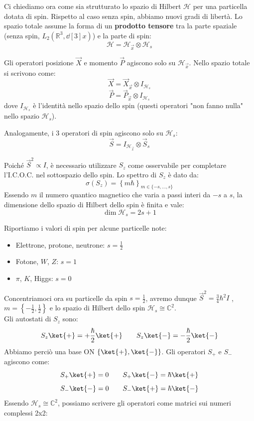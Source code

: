 Ci chiediamo ora come sia strutturato lo spazio di Hilbert \(\mathcal{H}\) per una particella dotata di spin.
Rispetto al caso senza spin, abbiamo nuovi gradi di libertà. Lo spazio totale assume la forma di un \textbf{prodotto tensore} tra la parte spaziale (senza spin, \(L_2(\mathbb{R}^3, \dd[3]{x})\)) e la parte di spin:
\begin{equation}
    \mathcal{H} = \mathcal{H}_{\vec{x}} \otimes \mathcal{H}_s
\end{equation}

Gli operatori posizione \(\vec{X}\) e momento \(\vec{P}\) agiscono solo su \(\mathcal{H}_{\vec{x}}\). Nello spazio totale si scrivono come:
\[
    \vec{X} = \vec{X}_{\vec{x}} \otimes I_{\mathcal{H}_s}
\]
\[
    \vec{P} = \vec{P}_{\vec{x}} \otimes I_{\mathcal{H}_s}
\]
dove \(I_{\mathcal{H}_s}\) è l'identità nello spazio dello spin (questi operatori "non fanno nulla" nello spazio \(\mathcal{H}_s\)).

Analogamente, i 3 operatori di spin agiscono solo su \(\mathcal{H}_s\):
\[
    \vec{S} = I_{\mathcal{H}_{\vec{x}}} \otimes \vec{S}_s
\]

Poiché \(\vec{S}^2 \propto I\), è necessario utilizzare \(S_z\) come osservabile per completare l'I.C.O.C. nel sottospazio dello spin. Lo spettro di \(S_z\) è dato da:
\begin{equation}
    \sigma(S_z) = \left\{ m\hbar \right\}_{m \in \{-s, \dots, s\}}
\end{equation}
Essendo \(m\) il numero quantico magnetico che varia a passi interi da \(-s\) a \(s\), la dimensione dello spazio di Hilbert dello spin è finita e vale:
\begin{equation}
    \dim \mathcal{H}_s = 2s+1
\end{equation}

\begin{example}
    Riportiamo i valori di spin per alcune particelle note:
    \begin{itemize}
        \item Elettrone, protone, neutrone: \( s = \frac{1}{2} \)
        \item Fotone, \( W \), \( Z \): \( s = 1 \)
        \item \( \pi \), \( K \), Higgs: \( s = 0 \)
    \end{itemize}
\end{example}




Concentriamoci ora su particelle da spin \(s = \frac{1}{2}\), avremo dunque \(\vec{S}^2= \frac{3}{4}\hbar^2 I\) , \(m = \left\{ -\frac{1}{2},\frac{1}{2} \right\}\) e lo spazio di Hilbert dello spin \(\mathcal{H}_s \cong\mathbb{C}^2\).\\
Gli autostati di \(S_z\) sono:
\[
    S_z\ket{+}=+ \frac{\hbar}{2} \ket{+} \qquad S_z\ket{-}=-\frac{\hbar}{2} \ket{-}
\]
Abbiamo perciò una base ON \(\left\{ \ket{+},\ket{-} \right\}\). Gli operatori \(S_+\) e \(S_-\) agiscono come:
\[
    S_+\ket{+}=0 \qquad S_+\ket{-}= \hbar\ket{+}
\]
\[ 
    S_-\ket{-}=0 \qquad S_-\ket{+}= \hbar\ket{-}
\]
Essendo \(\mathcal{H}_s \cong\mathbb{C}^2\), possiamo scrivere gli operatori come matrici sui numeri complessi 2x2:

